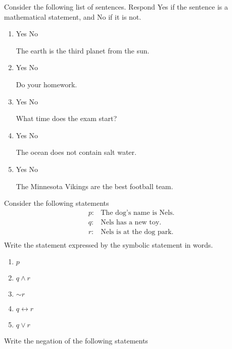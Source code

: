 \documentclass[addpoints,12pt]{exam}
\newcommand{\ynn}{
\begin{oneparcheckboxes}
\choice Yes
\CorrectChoice No
	\end{oneparcheckboxes}
}
\newcommand{\yny}{
\begin{oneparcheckboxes}
\CorrectChoice Yes
\choice No 
	\end{oneparcheckboxes}
}
\begin{document}
\begin{center}
\end{center}
\vspace{0.1in}
\vspace{0.2in}



\begin{questions}
\question Consider the following list of sentences. Respond Yes if the sentence is a mathematical statement, and No if it is not. 
\begin{enumerate}[label = \alph*)]
	\item \yny The earth is the third planet from the sun.   
	\item \ynn Do your homework. 
	\item \ynn What time does the exam start? 
	\item \yny The ocean does not contain salt water. 
	\item \ynn The Minnesota Vikings are the best football team.  
\end{enumerate}
\question Consider the following statements 
\begin{align*}
	p:  & \text{The dog's name  is Nels.} \\
	q: & \text{Nels has a new toy. } \\
	r: & \text{Nels is at the dog park.} \\
\end{align*}
Write the statement expressed by the symbolic statement in words. 
\begin{enumerate}[label = \alph*)]
    \item $p $ 
		\item $q \wedge r$ 
		\item $\sim r $
		\item $q \leftrightarrow  r $ 
		\item  $q \vee r $
\end{enumerate}
\question Write the negation of the following statements 
\begin{enumerate}[label = \alph*)]

\end{enumerate}
\end{questions}
\end{document}
